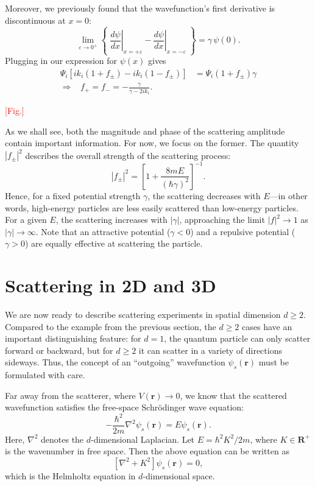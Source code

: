 \documentclass[pra,11pt]{revtex4}
\begin{document}
Moreover, we previously found that the wavefunction's first
derivative is discontinuous at $x=0$:
$$\lim_{\varepsilon\rightarrow 0^+} \left\{\; \left.\frac{d\psi}{dx}\right|_{x = +\varepsilon} - \left.\frac{d\psi}{dx}\right|_{x = -\varepsilon}\; \right\}  =  \gamma\, \psi(0).$$
Plugging in our expression for $\psi(x)$ gives
$$\begin{aligned}\Psi_i\left[ik_i(1+f_\pm) - ik_i(1-f_\pm)\right]  &=  \Psi_i(1+f_\pm) \gamma \\ \Rightarrow \;\;\; f_+ = f_- = -\frac{\gamma}{\gamma - 2ik_i}.\end{aligned}$$

\textcolor{red}{[Fig.]}

As we shall see, both the magnitude and phase of the scattering
amplitude contain important information.  For now, we focus on the
former.  The quantity $|f_\pm|^2$ describes the overall strength of
the scattering process:
$$|f_\pm|^2 = \left[1 + \frac{8mE}{(\hbar\gamma)^2}\right]^{-1}.$$
Hence, for a fixed potential strength $\gamma$, the scattering
decreases with $E$---in other words, high-energy particles are less
easily scattered than low-energy particles.  For a given $E$, the
scattering increases with $|\gamma|$, approaching the limit $|f|^2
\rightarrow 1$ as $|\gamma|\rightarrow \infty$.  Note that an
attractive potential ($\gamma < 0$) and a repulsive potential ($\gamma
> 0$) are equally effective at scattering the particle.

\section{Scattering in 2D and 3D}

We are now ready to describe scattering experiments in spatial
dimension $d \ge 2$.  Compared to the example from the previous
section, the $d \ge 2$ cases have an important distinguishing feature:
for $d = 1$, the quantum particle can only scatter forward or
backward, but for $d \ge 2$ it can scatter in a variety of directions
sideways.  Thus, the concept of an ``outgoing'' wavefunction
$\psi_s(\mathbf{r})$ must be formulated with care.

Far away from the scatterer, where $V(\mathbf{r})\rightarrow 0$, we
know that the scattered wavefunction satisfies the free-space
Schr\"odinger wave equation:
$$-\frac{\hbar^2}{2m} \nabla^2 \psi_s(\mathbf{r}) = E \psi_s(\mathbf{r}).$$
Here, $\nabla^2$ denotes the $d$-dimensional Laplacian.  Let $E =
\hbar^2 K^2 / 2m$, where $K \in \mathbf{R}^+$ is the wavenumber in
free space.  Then the above equation can be written as
$$\left[\nabla^2 + K^2\right] \psi_s(\mathbf{r}) = 0,$$
which is the Helmholtz equation in $d$-dimensional space.
\end{document}
